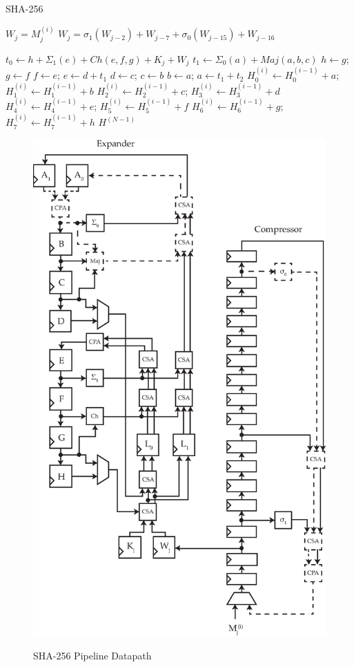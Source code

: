 \documentclass[portrait,a0,final]{a0poster}
\begin{document}
\begin{multicols}{3}
\hfill
\begin{algorithm}[H]
\caption{SHA-256}
\label{alg:sha256}
\begin{algorithmic}[1]

 \label{alg:line:expand}
\State $W_j = M^{(i)}_j$
\EndFor
{}
\State $W_j = \sigma_1(W_{j-2}) + W_{j-7} + \sigma_0(W_{j-15}) + W_{j-16}$
\EndFor

\Statex
{} \label{alg:line:compress}
\State $t_0 \gets h + \Sigma_1(e) + Ch(e,f,g) + K_j + W_j$
\State $t_1 \gets \Sigma_0(a) + Maj(a,b,c)$
\State $h \gets g$; $g \gets f$
\State $f \gets e$; $e \gets d + t_1$
\State $d \gets c$; $c \gets b$
\State $b \gets a$; $a \gets t_1 + t_2$
\Statex
\State $H^{(i)}_0 \gets H^{(i-1)}_0 + a$; $H^{(i)}_1 \gets H^{(i-1)}_1 + b$
\State $H^{(i)}_2 \gets H^{(i-1)}_2 + c$; $H^{(i)}_3 \gets H^{(i-1)}_3 + d$
\State $H^{(i)}_4 \gets H^{(i-1)}_4 + e$; $H^{(i)}_5 \gets H^{(i-1)}_5 + f$
\State $H^{(i)}_6 \gets H^{(i-1)}_6 + g$; $H^{(i)}_7 \gets H^{(i-1)}_7 + h$
\EndFor
\EndFor
\State \Return $H^{(N-1)}$
\EndFunction
\end{algorithmic}
\end{algorithm}

\hfill
\begin{figure}[H]
\caption{SHA-256 Pipeline Datapath}
\centering
\includegraphics[width=0.8\linewidth]{sha256_datapath}
\label{fig:sha256_datapath}
\end{figure}


\end{multicols}
\end{document}
